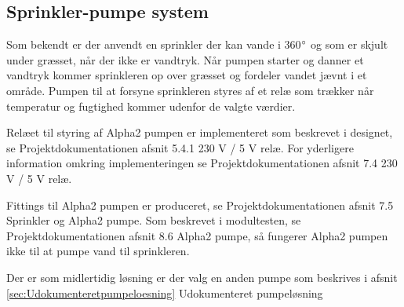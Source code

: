 \subsection{Sprinkler-pumpe system}
Som bekendt er der anvendt en sprinkler der kan vande i 360$^{\circ}$ og som er skjult under græsset, når der ikke er vandtryk. Når pumpen starter og danner et vandtryk kommer sprinkleren op over græsset og fordeler vandet jævnt i et område. 
Pumpen til at forsyne sprinkleren styres af et relæ som trækker når temperatur og fugtighed kommer udenfor de valgte værdier.

Relæet til styring af Alpha2 pumpen er implementeret som beskrevet i designet, se Projektdokumentationen afsnit 5.4.1 230 V / 5 V relæ. For yderligere information omkring implementeringen se Projektdokumentationen afsnit 7.4 230 V / 5 V relæ. 

Fittings til Alpha2 pumpen er produceret, se Projektdokumentationen afsnit 7.5 Sprinkler og Alpha2 pumpe. Som beskrevet i modultesten, se Projektdokumentationen afsnit 8.6 Alpha2 pumpe, så fungerer Alpha2 pumpen ikke til at pumpe vand til sprinkleren. 

Der er som midlertidig løsning er der valg en anden pumpe som beskrives i afsnit \ref{sec:Udokumenteretpumpeloesning} Udokumenteret pumpeløsning